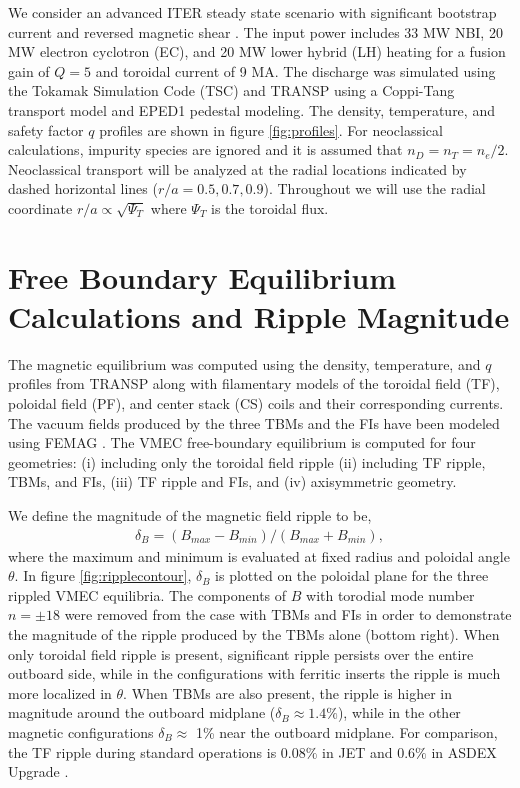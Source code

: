 \documentclass{article}
\numberwithin{figure}{section}
\numberwithin{equation}{section}
\begin{document}
We consider an advanced ITER steady state scenario with significant bootstrap current and reversed magnetic shear \cite{Poli2014}. The input power includes 33 MW NBI, 20 MW electron cyclotron (EC), and 20 MW lower hybrid (LH) heating for a fusion gain of $Q = 5$ and toroidal current of 9 MA. The discharge was simulated using the Tokamak Simulation Code (TSC) \cite{Jardin1986} and TRANSP \cite{Hawryluk1980} using a Coppi-Tang \cite{Jardin1993} transport model and EPED1 \cite{Snyder2011} pedestal modeling. The density, temperature, and safety factor $q$ profiles are shown in figure \ref{fig:profiles}. For neoclassical calculations, impurity species are ignored and it is assumed that $n_D = n_T = n_e/2$. Neoclassical transport will be analyzed at the radial locations indicated by dashed horizontal lines ($r/a = 0.5, 0.7, 0.9$). Throughout we will use the radial coordinate $r/a \propto \sqrt{\Psi_T}$ where $\Psi_T$ is the toroidal flux.

\FloatBarrier

\section{Free Boundary Equilibrium Calculations and Ripple Magnitude} \label{vmec}

The magnetic equilibrium was computed using the density, temperature, and $q$ profiles from TRANSP along with filamentary models of the toroidal field (TF), poloidal field (PF), and center stack (CS) coils and their corresponding currents. The vacuum fields produced by the three TBMs and the FIs have been modeled using FEMAG \cite{Shinohara2009}. The VMEC free-boundary equilibrium \cite{Hirshman1986} is computed for four geometries: (i) including only the toroidal field ripple (ii) including TF ripple, TBMs, and FIs, (iii) TF ripple and FIs, and (iv) axisymmetric geometry.  

We define the magnitude of the magnetic field ripple to be,
\begin{gather}
\delta_B = (B_{max}-B_{min})/(B_{max} + B_{min}), 
\end{gather}
where the maximum and minimum is evaluated at fixed radius and poloidal angle $\theta$. In figure \ref{fig:ripplecontour}, $\delta_B$ is plotted on the poloidal plane for the three rippled VMEC equilibria. The components of $B$ with torodial mode number $n = \pm 18$ were removed from the case with TBMs and FIs in order to demonstrate the magnitude of the ripple produced by the TBMs alone (bottom right). When only toroidal field ripple is present, significant ripple persists over the entire outboard side, while in the configurations with ferritic inserts the ripple is much more localized in $\theta$. When TBMs are also present, the ripple is higher in magnitude around the outboard midplane ($\delta_B \approx 1.4\%$), while in the other magnetic configurations $\delta_B \approx$ 1\% near the outboard midplane. For comparison, the TF ripple during standard operations is $0.08\%$ in JET \cite{DeVries2008} and $0.6\%$ in ASDEX Upgrade \cite{Martitsch2016}. 
\end{document}

